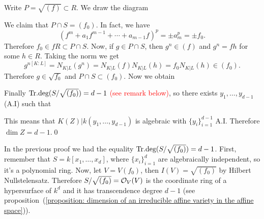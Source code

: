 Write $P=\sqrt{(f)}\subset R$. We draw the diagram
\begin{center}
\end{center}
We claim that $P\cap S= (f_0)$. In fact, we have 
\begin{equation}
    (f^m+a_1 f^{m-1}+\cdots +a_{m-1}f)^p = \pm a_m^p=\pm f_0.
\end{equation}
Therefore $f_0\in f R \subset P\cap S$. Now, if $g\in P\cap S$, then $g^n\in (f)$ and 
$g^n=fh$ for some $h\in R$. Taking the norm we get 
\begin{equation}
   g^{n[K:L]}= N_{K|L}(g^n) = N_{K|L}(f)N_{K|L}(h) = f_0 N_{K|L}(h)\in (f_0).
\end{equation}
Therefore $g\in\sqrt{f_0}$ and $P\cap S\subset (f_0)$. Now we obtain 
\begin{center}
\end{center}
Finally $\text{Tr.deg}(S/\sqrt{(f_0)})=d-1$ \textcolor{red}{(see remark below)}, so there exists 
$y_1,\dots, y_{d-1}$ (A.I) such that 
\begin{center}
\end{center}
This means that $K(Z)|k(y_1,\dots,y_{d-1})$ is algebraic with $\{y_i\}_{i=1}^{d-1}$ A.I. Therefore 
$\dim Z = d-1$.\qed

\begin{dang}
\begin{remark}
    In the previous proof we had the equality $\text{Tr.deg}(S/\sqrt{(f_0)})=d-1$. First, remember that 
    $S=k[x_1,\dots,x_d]$, where $\{x_i\}_{i=1}^d$ are algebraically independent, so it's a polynomial ring. 
    Now, let $V=V(f_0)$, then $I(V)=\sqrt{(f_0)}$ by Hilbert Nullstelensatz. Therefore 
    $S/\sqrt{(f_0)} = \mathcal{O}_V(V)$ is the coordinate ring of a hypersurface of $k^d$ and it has transcendence degree 
    $d-1$ (see proposition~(\ref{proposition: dimension of an irreducible affine variety in the affine space})).
\end{remark}
\end{dang}

